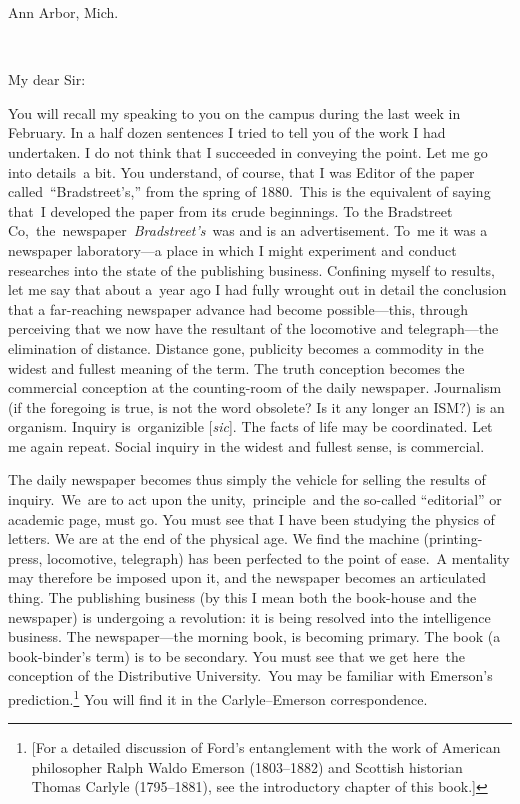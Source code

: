 \documentclass[twoside,symmetric,nobib,justified]{tufte-book}
\begin{document}
Ann Arbor, Mich.~

~

\noindent My dear Sir:~


You will recall my speaking to you on the campus during the last week in
February. In a half dozen sentences I tried to tell you of the work I
had undertaken. I do not think that I succeeded in conveying the point.
Let me go into details~a bit. You understand, of course, that I was
Editor of the paper called~``Bradstreet's,'' from the spring of
1880.~This is the equivalent of saying that~I developed the paper from
its crude beginnings. To the Bradstreet
Co,~the~newspaper~\emph{Bradstreet's}~was and is an advertisement. To~me
it was a newspaper laboratory---a place in which I might experiment and
conduct researches into the state of the publishing business. Confining
myself to results, let me say that about a~year ago I had fully wrought
out in detail the conclusion that a far-reaching newspaper advance had
become possible---this, through perceiving that we now have the
resultant of the locomotive and telegraph---the elimination of distance.
Distance gone, publicity becomes a commodity in the widest and fullest
meaning of the term. The truth conception becomes the commercial
conception at the counting-room of the daily newspaper. Journalism (if
the foregoing is true, is not the word obsolete? Is it any longer an
ISM?) is an organism. Inquiry is~organizible {[}\emph{sic}{]}. The facts
of life may be coordinated. Let me again repeat. Social inquiry in the
widest and fullest sense, is commercial.~

The daily newspaper becomes thus simply the vehicle for selling the
results of inquiry.~We~are to act upon the unity,~principle~and the
so-called ``editorial'' or academic page, must go. You must see that I
have been studying the physics of letters. We are at the end of the
physical age. We find the machine (printing-press, locomotive,
telegraph) has been perfected to the point of ease.~A mentality may
therefore be imposed upon it, and the newspaper becomes an articulated
thing. The publishing business (by this I mean both the book-house and
the newspaper) is undergoing a revolution: it is being resolved into the
intelligence business. The newspaper---the morning book, is becoming
primary. The book (a book-binder's term) is to be secondary. You must
see that we get here~the conception of the Distributive University.~You
may be familiar with Emerson's prediction.\footnote{{[}For a detailed
  discussion of Ford's entanglement with the work of American
  philosopher Ralph Waldo Emerson (1803--1882) and Scottish historian
  Thomas Carlyle (1795--1881), see the introductory chapter of this
  book.{]}} You will find it in the Carlyle--Emerson correspondence.~
\end{document}

